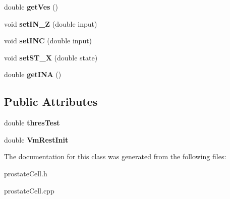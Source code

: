 \begin{DoxyCompactItemize}
\item 
double {\bfseries get\+Ves} ()\hypertarget{classprostateCell_a13901cbcf8ba792ee58a11bce23f0f08}{}\label{classprostateCell_a13901cbcf8ba792ee58a11bce23f0f08}

\item 
void {\bfseries set\+I\+N\+\_\+Z} (double input)\hypertarget{classprostateCell_ab94aa451e97270e66000bbe0f34fb9af}{}\label{classprostateCell_ab94aa451e97270e66000bbe0f34fb9af}

\item 
void {\bfseries set\+I\+NC} (double input)\hypertarget{classprostateCell_a57e8f2250efb5cfe7a9a897604bcdca4}{}\label{classprostateCell_a57e8f2250efb5cfe7a9a897604bcdca4}

\item 
void {\bfseries set\+S\+T\+\_\+X} (double state)\hypertarget{classprostateCell_a5ec6c56303e348538f6feedfb2e4cef7}{}\label{classprostateCell_a5ec6c56303e348538f6feedfb2e4cef7}

\item 
double {\bfseries get\+I\+NA} ()\hypertarget{classprostateCell_ac9bc1cdd74aa959c73e72c1471c03ac0}{}\label{classprostateCell_ac9bc1cdd74aa959c73e72c1471c03ac0}

\end{DoxyCompactItemize}
\subsection*{Public Attributes}
\begin{DoxyCompactItemize}
\item 
double {\bfseries thres\+Test}\hypertarget{classprostateCell_a3e5f95dddd1a3bb9c1d8858be48378ea}{}\label{classprostateCell_a3e5f95dddd1a3bb9c1d8858be48378ea}

\item 
double {\bfseries Vm\+Rest\+Init}\hypertarget{classprostateCell_a70fe18deb1b4910a4a3ee91fe7c3898a}{}\label{classprostateCell_a70fe18deb1b4910a4a3ee91fe7c3898a}

\end{DoxyCompactItemize}


The documentation for this class was generated from the following files\+:\begin{DoxyCompactItemize}
\item 
prostate\+Cell.\+h\item 
prostate\+Cell.\+cpp\end{DoxyCompactItemize}
